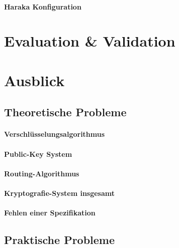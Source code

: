 \documentclass[	%
				a4paper, %
				onecolumn, %
				oneside, %
				titlepage, %
				openany, %
				12pt] %
				{report}
\begin{document}
			\subsubsection{Haraka Konfiguration}
								
							
\chapter{Evaluation \& Validation}
	
	
\chapter{Ausblick}
	
	\section{Theoretische Probleme}
		
		\subsubsection{Verschlüsselungsalgorithmus}
			
		\subsubsection{Public-Key System}
			
		\subsubsection{Routing-Algorithmus}
							\subsubsection{Kryptografie-System insgesamt}
				
		\subsubsection{Fehlen einer Spezifikation}
					

	\section{Praktische Probleme}
		
\end{document}
